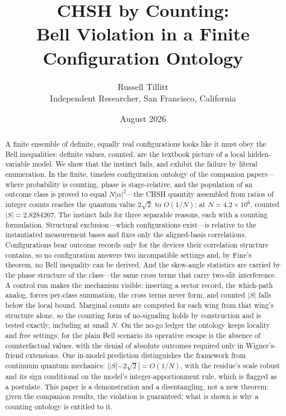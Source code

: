 \documentclass[11pt]{article}
\title{CHSH by Counting:\\ Bell Violation in a Finite Configuration Ontology}
\author{Russell Tillitt\\ \small Independent Researcher, San Francisco, California}
\date{August 2026}
\theoremstyle{definition}
\theoremstyle{remark}
\begin{document}
\maketitle

\begin{abstract}
A finite ensemble of definite, equally real configurations looks like it must obey the Bell inequalities: definite values, counted, are the textbook picture of a local hidden-variable model. We show that the instinct fails, and exhibit the failure by literal enumeration. In the finite, timeless configuration ontology of the companion papers---where probability is counting, phase is stage-relative, and the population of an outcome class is proved to equal $N|\alpha|^2$---the CHSH quantity assembled from ratios of integer counts reaches the quantum value $2\sqrt{2}$ to $O(1/N)$; at $N = 4.2 \times 10^6$, counted $|S| = 2.8284267$. The instinct fails for three separable reasons, each with a counting formulation. Structural exclusion---which configurations exist---is relative to the instantiated measurement bases and fixes only the aligned-basis correlations. Configurations bear outcome records only for the devices their correlation structure contains, so no configuration answers two incompatible settings and, by Fine's theorem, no Bell inequality can be derived. And the skew-angle statistics are carried by the phase structure of the class---the same cross terms that carry two-slit interference. A control run makes the mechanism visible: inserting a sector record, the which-path analog, forces per-class summation, the cross terms never form, and counted $|S|$ falls below the local bound. Marginal counts are computed for each wing from that wing's structure alone, so the counting form of no-signaling holds by construction and is tested exactly, including at small $N$. On the no-go ledger the ontology keeps locality and free settings; for the plain Bell scenario its operative escape is the absence of counterfactual values, with the denial of absolute outcomes required only in Wigner's-friend extensions. One in-model prediction distinguishes the framework from continuum quantum mechanics: $||S| - 2\sqrt{2}| = O(1/N)$, with the residue's scale robust and its sign conditional on the model's integer-apportionment rule, which is flagged as a postulate. This paper is a demonstration and a disentangling, not a new theorem: given the companion results, the violation is guaranteed; what is shown is why a counting ontology is entitled to it.
\end{abstract}
\end{document}
